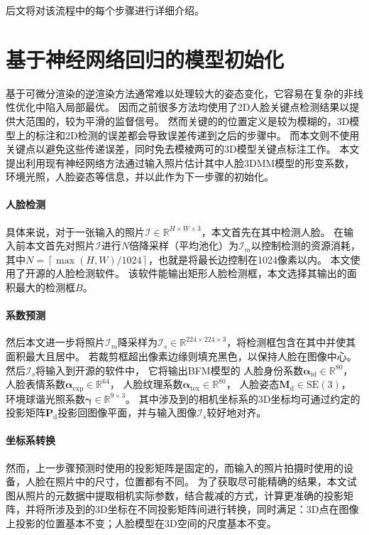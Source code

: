 后文将对该流程中的每个步骤进行详细介绍。

\section{基于神经网络回归的模型初始化}
\label{sec:recon_init}

基于可微分渲染的逆渲染方法通常难以处理较大的姿态变化，它容易在复杂的非线性优化中陷入局部最优。
因而之前很多方法均使用了2D人脸关键点检测结果以提供大范围的，较为平滑的监督信号。
然而关键的的位置定义是较为模糊的，3D模型上的标注和2D检测的误差都会导致误差传递到之后的步骤中。
而本文则不使用关键点以避免这些传递误差，同时免去模棱两可的3D模型关键点标注工作。
本文提出利用现有神经网络方法\citep{deep3d}通过输入照片估计其中人脸3DMM模型的形变系数，环境光照，人脸姿态等信息，并以此作为下一步骤的初始化。

\paragraph{人脸检测}
具体来说，对于一张输入的照片$\mathcal{I}\in\mathbb{R}^{H\times W\times 3}$，本文首先在其中检测人脸。
在输入前本文首先对照片$\mathcal{I}$进行$N$倍降采样（平均池化）为$\mathcal{I}_m$以控制检测的资源消耗，其中$N=\left\lceil \max(H, W) / 1024\right\rceil$，也就是将最长边控制在1024像素以内。
本文使用了\citet{SFD}开源的人脸检测软件。
该软件能输出矩形人脸检测框，本文选择其输出的面积最大的检测框$B$。

\paragraph{系数预测}
然后本文进一步将照片$\mathcal{I}_m$降采样为$\mathcal{I}_s\in\mathbb{R}^{224\times 224\times 3}$，将检测框包含在其中并使其面积最大且居中。
若裁剪框超出像素边缘则填充黑色，以保持人脸在图像中心。
然后$\mathcal{I}_s$将输入到\citet{deep3d}开源的软件中，
它将输出BFM模型\citep{BFM}的
人脸身份系数$\mathbf{\alpha}_\mathrm{id}\in\mathbb{R}^{80}$，
人脸表情系数$\mathbf{\alpha}_\mathrm{exp}\in\mathbb{R}^{64}$，
人脸纹理系数$\mathbf{\alpha}_\mathrm{tex}\in\mathbb{R}^{80}$，
人脸姿态$\mathbf{M}_\mathrm{d}\in\mathrm{SE(3)}$，
环境球谐光照系数$\mathbf{\gamma}\in\mathbb{R}^{9\times 3}$。
其中涉及到的相机坐标系的3D坐标均可通过约定的投影矩阵$\mathbf{P}_\mathrm{d}$投影回图像平面，并与输入图像$\mathcal{I}_s$较好地对齐。

\paragraph{坐标系转换}
然而，上一步骤预测时使用的投影矩阵是固定的，而输入的照片拍摄时使用的设备，人脸在照片中的尺寸，位置都有不同。
为了获取尽可能精确的结果，本文试图从照片的元数据中提取相机实际参数，结合裁减的方式，计算更准确的投影矩阵，并将所涉及到的3D坐标在不同投影矩阵间进行转换，同时满足：3D点在图像上投影的位置基本不变；人脸模型在3D空间的尺度基本不变。

